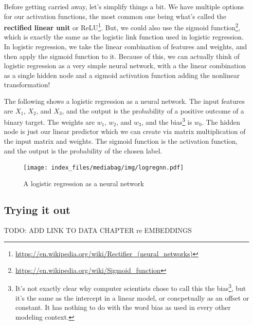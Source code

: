 \documentclass[
  letterpaper,
]{krantz}
\DeclareRobustCommand{\href}[2]{#2\footnote{\url{#1}}}
\begin{document}
Before getting carried away, let's simplify things a bit. We have
multiple options for our activation functions, the most common one being
what's called the \textbf{rectified linear unit} or
\href{https://en.wikipedia.org/wiki/Rectifier_(neural_networks)}{ReLU}.
But, we could also use the
\href{https://en.wikipedia.org/wiki/Sigmoid_function}{sigmoid function},
which is exactly the same as the logistic link function used in logistic
regression. In logistic regression, we take the linear combination of
features and weights, and then apply the sigmoid function to it. Because
of this, we can actually think of logistic regression as a very simple
neural network, with a the linear combination as a single hidden node
and a sigmoid activation function adding the nonlinear transformation!

The following shows a logistic regression as a neural network. The input
features are \(X_1\), \(X_2\), and \(X_3\), and the output is the
probability of a positive outcome of a binary target. The weights are
\(w_1\), \(w_2\), and \(w_3\), and the bias\footnote{It's not exactly
  clear
  \href{https://stats.stackexchange.com/questions/511726/different-usage-of-the-term-bias-in-stats-machine-learning}{why
  computer scientists chose to call this the bias}, but it's the same as
  the intercept in a linear model, or concpetually as an offset or
  constant. It has nothing to do with the word bias as used in every
  other modeling context.} is \(w_0\). The hidden node is just our
linear predictor which we can create via matrix multiplication of the
input matrix and weights. The sigmoid function is the activation
function, and the output is the probability of the chosen label.

\hypertarget{logistic-nn-graph}{}

\begin{figure}

{\centering \texttt{[image: index\_files/mediabag/img/logregnn.pdf]}

}

\caption{A logistic regression as a neural network}

\end{figure}

\subsection{Trying it out}\label{trying-it-out}

TODO: ADD LINK TO DATA CHAPTER re EMBEDDINGS
\end{document}
